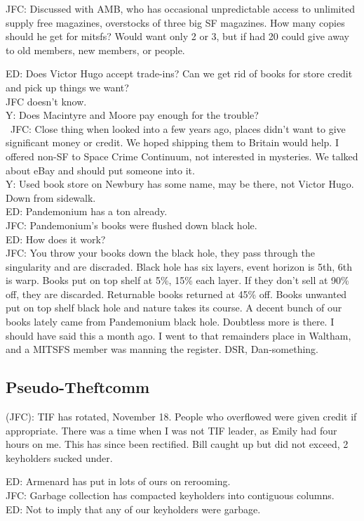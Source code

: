 \documentclass[10pt]{article}
\begin{document}
 JFC: Discussed with AMB, who has occasional unpredictable access to
unlimited supply free magazines, overstocks of three big SF magazines.
How many copies should he get for mitsfs?  Would want only 2 or 3, but
if had 20 could give away to old members, new members, or people.

ED: Does Victor Hugo accept trade-ins?  Can we get rid of books for
store credit and pick up things we want?\\
JFC doesn't know.  \\
Y: Does Macintyre and Moore pay enough for the trouble? \\\
JFC: Close thing when looked into a few years ago, places didn't want
to give significant money or credit.  We hoped shipping them to
Britain would help.  I offered non-SF to Space Crime Continuum, not
interested in mysteries.  We talked about eBay and should put someone
into it.  \\
Y: Used book store on Newbury has some name, may be there,
not Victor Hugo.  Down from sidewalk.\\
ED: Pandemonium has a ton already. \\
JFC: Pandemonium's books were flushed down black hole.\\
ED: How does it work? \\
JFC: You throw your books down the black hole, they pass
through the singularity and are discraded.  Black hole has six layers,
event horizon is 5th, 6th is warp.  Books put on top shelf at 5\%, 15\%
each layer.  If they don't sell at 90\% off, they are discarded.
Returnable books returned at 45\% off.  Books unwanted put on top shelf
black hole and nature takes its course.  A decent bunch of our books
lately came from Pandemonium black hole.  Doubtless more is there.  I
should have said this a month ago.  I went to that remainders place in
Waltham, and a MITSFS member was manning the register.  DSR,
Dan-something.

\subsection*{Pseudo-Theftcomm}
(JFC): TIF has rotated, November 18.  People who overflowed were given
credit if appropriate.  There was a time when I was not TIF leader, as
Emily had four hours on me.  This has since been rectified.  Bill
caught up but did not exceed, 2 keyholders sucked under.  

ED: Armenard has put in lots of ours on rerooming.  \\
JFC: Garbage collection has compacted keyholders into contiguous
columns.\\
ED: Not to imply that any of our keyholders were garbage.
\end{document}
